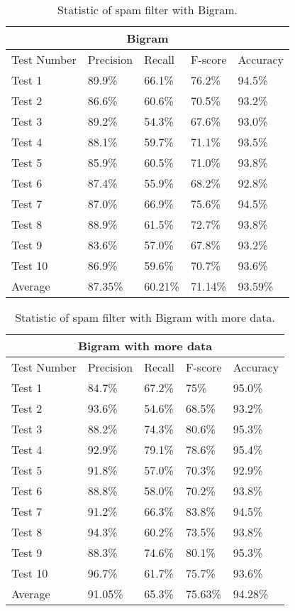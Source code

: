 \documentclass{article}
\begin{document}
\begin{table}[H]
\centering
\begin{tabular}{ |p{2cm}|p{1.1cm}|p{1cm}| p{1.5cm}|p{1.2cm}| }
\hline
\multicolumn{5}{|c|}{Bigram} \\
\hline
Test Number& Precision &Recall &F-score &Accuracy\\
\hline
Test 1 & 89.9\% &66.1\%&76.2\% &  94.5\%\\
Test 2 & 86.6\%   & 60.6\% &70.5\% &93.2\%\\
Test 3 &89.2\% & 54.3\%&67.6\% &93.0\% \\
Test 4 &88.1\% & 59.7\%&71.1\% &93.5\% \\
Test 5 & 85.9\% & 60.5\% &71.0\% &93.8\%\\
Test 6 & 87.4\% & 55.9\% &68.2\% & 92.8\% \\
Test 7 & 87.0\% & 66.9\% &75.6\% &94.5\%\\
Test 8 & 88.9\% & 61.5\% &72.7\% &93.8\%\\
Test 9 & 83.6\% & 57.0\% &67.8\% &93.2\%\\
Test 10 & 86.9\% & 59.6\% &70.7\% &93.6\%\\
\hline
Average & 87.35\% & 60.21\% &71.14\% &93.59\%\\
\hline
\end{tabular}
\caption{Statistic of spam filter with Bigram.}
\end{table}
\begin{table}[h]
\centering
\begin{tabular}{ |p{2cm}|p{1.1cm}|p{1cm}| p{1.5cm}|p{1.2cm}| }
\hline
\multicolumn{5}{|c|}{Bigram with more data} \\
\hline
Test Number& Precision &Recall &F-score &Accuracy\\
\hline
Test 1 & 84.7\% &67.2\%&75\% &  95.0\%\\
Test 2 & 93.6\%   & 54.6\% &68.5\% &93.2\%\\
Test 3 &88.2\% & 74.3\%&80.6\% &95.3\% \\
Test 4 &92.9\% & 79.1\%&78.6\% &95.4\% \\
Test 5 & 91.8\% & 57.0\% &70.3\% &92.9\%\\
Test 6 & 88.8\% & 58.0\% &70.2\% & 93.8\% \\
Test 7 & 91.2\% & 66.3\% &83.8\% &94.5\%\\
Test 8 & 94.3\% & 60.2\% &73.5\% &93.8\%\\
Test 9 & 88.3\% & 74.6\% &80.1\% &95.3\%\\
Test 10 & 96.7\% & 61.7\% &75.7\% &93.6\%\\
\hline
Average & 91.05\% & 65.3\% &75.63\% &94.28\%\\
\hline
\end{tabular}
\caption{Statistic of spam filter with Bigram with more data.}
\end{table}
\end{document}
